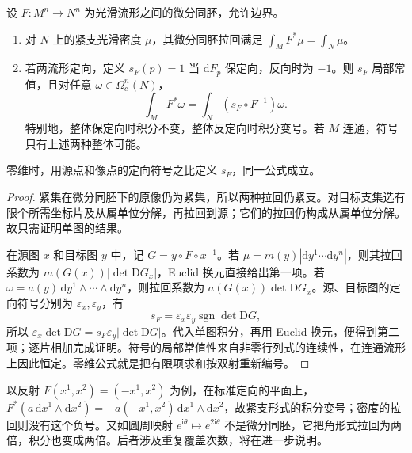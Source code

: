 \begin{theorem}
	\label{g1:thm:oriented-change-variables}
	设 \(F:M^n\to N^n\) 为光滑流形之间的微分同胚，允许边界。
	\begin{enumerate}
		\item 对 \(N\) 上的紧支光滑密度 \(\mu\)，其微分同胚拉回满足 \(\int_M F^*\mu=\int_N\mu\)。
		\item 若两流形定向，定义 \(s_F(p)=1\) 当 \(\mathrm{d}F_p\) 保定向，反向时为 \(-1\)。则 \(s_F\) 局部常值，且对任意 \(\omega\in\Omega_c^n(N)\)，
		\[
			\int_M F^*\omega=\int_N(s_F\circ F^{-1})\omega.
		\]
		特别地，整体保定向时积分不变，整体反定向时积分变号。若 \(M\) 连通，符号只有上述两种整体可能。
	\end{enumerate}
	零维时，用源点和像点的定向符号之比定义 \(s_F\)，同一公式成立。
\end{theorem}
\begin{proof}
	紧集在微分同胚下的原像仍为紧集，所以两种拉回仍紧支。对目标支集选有限个所需坐标片及从属单位分解，再拉回到源；它们的拉回仍构成从属单位分解。故只需证明单图的结果。

	在源图 \(x\) 和目标图 \(y\) 中，记 \(G=y\circ F\circ x^{-1}\)。若 \(\mu=m(y)|\mathrm{d}y^1\cdots\mathrm{d}y^n|\)，则其拉回系数为 \(m(G(x))|\det \mathrm{D}G_x|\)，Euclid 换元直接给出第一项。若 \(\omega=a(y)\,\mathrm{d}y^1\wedge\cdots\wedge\mathrm{d}y^n\)，则拉回系数为 \(a(G(x))\det \mathrm{D}G_x\)。源、目标图的定向符号分别为 \(\varepsilon_x,\varepsilon_y\)，有
	\[
		s_F=\varepsilon_x\varepsilon_y\operatorname{sgn}\det \mathrm{D}G,
	\]
	所以 \(\varepsilon_x\det \mathrm{D}G=s_F\varepsilon_y|\det \mathrm{D}G|\)。代入单图积分，再用 Euclid 换元，便得到第二项；逐片相加完成证明。符号的局部常值性来自非零行列式的连续性，在连通流形上因此恒定。零维公式就是把有限项求和按双射重新编号。
\end{proof}

以反射 \(F(x^1,x^2)=(-x^1,x^2)\) 为例，在标准定向的平面上，\(F^*(a\,\mathrm{d}x^1\wedge\mathrm{d}x^2)=-a(-x^1,x^2)\,\mathrm{d}x^1\wedge\mathrm{d}x^2\)，故紧支形式的积分变号；密度的拉回则没有这个负号。又如圆周映射 \(e^{\mathrm{i}\theta}\mapsto e^{2\mathrm{i}\theta}\) 不是微分同胚，它把角形式拉回为两倍，积分也变成两倍。后者涉及重复覆盖次数，将在进一步说明。

